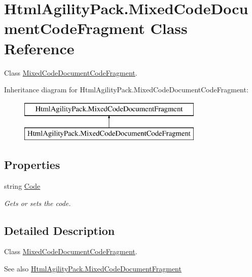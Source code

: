 \hypertarget{class_html_agility_pack_1_1_mixed_code_document_code_fragment}{}\section{Html\+Agility\+Pack.\+Mixed\+Code\+Document\+Code\+Fragment Class Reference}
\label{class_html_agility_pack_1_1_mixed_code_document_code_fragment}


Class \hyperlink{class_html_agility_pack_1_1_mixed_code_document_code_fragment}{Mixed\+Code\+Document\+Code\+Fragment}.  


Inheritance diagram for Html\+Agility\+Pack.\+Mixed\+Code\+Document\+Code\+Fragment\+:\begin{figure}[H]
\begin{center}
\leavevmode
\includegraphics[height=2.000000cm]{class_html_agility_pack_1_1_mixed_code_document_code_fragment}
\end{center}
\end{figure}
\subsection*{Properties}
\begin{DoxyCompactItemize}
\item 
string \hyperlink{class_html_agility_pack_1_1_mixed_code_document_code_fragment_a2bb5d78b24b15aa76b540bca5284b357}{Code}
\begin{DoxyCompactList}\small\item\em Gets or sets the code. \end{DoxyCompactList}\end{DoxyCompactItemize}


\subsection{Detailed Description}
Class \hyperlink{class_html_agility_pack_1_1_mixed_code_document_code_fragment}{Mixed\+Code\+Document\+Code\+Fragment}. 

\begin{DoxySeeAlso}{See also}
\hyperlink{class_html_agility_pack_1_1_mixed_code_document_fragment}{Html\+Agility\+Pack.\+Mixed\+Code\+Document\+Fragment}


\end{DoxySeeAlso}


